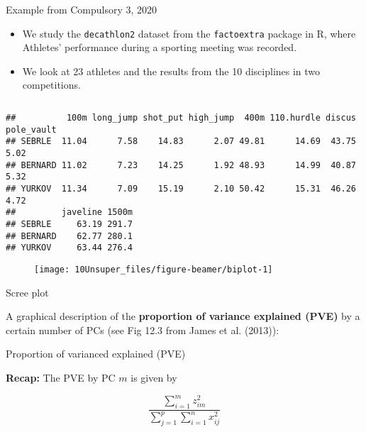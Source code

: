 \documentclass[
  10pt,
  ignorenonframetext,
]{beamer}
\begin{document}
\begin{frame}[fragile]
\begin{block}{Example from Compulsory 3, 2020}
\protect\hypertarget{example-from-compulsory-3-2020}{}
\(~\)

\begin{itemize}
\item
  We study the \texttt{decathlon2} dataset from the \texttt{factoextra}
  package in R, where Athletes' performance during a sporting meeting
  was recorded.
\item
  We look at 23 athletes and the results from the 10 disciplines in two
  competitions.
\end{itemize}

\(~\)

\scriptsize

\begin{verbatim}
##          100m long_jump shot_put high_jump  400m 110.hurdle discus pole_vault
## SEBRLE  11.04      7.58    14.83      2.07 49.81      14.69  43.75       5.02
## BERNARD 11.02      7.23    14.25      1.92 48.93      14.99  40.87       5.32
## YURKOV  11.34      7.09    15.19      2.10 50.42      15.31  46.26       4.72
##         javeline 1500m
## SEBRLE     63.19 291.7
## BERNARD    62.77 280.1
## YURKOV     63.44 276.4
\end{verbatim}
\end{block}
\end{frame}

\begin{frame}
\begin{figure}
\texttt{[image: 10Unsuper\_files/figure-beamer/biplot-1]} \end{figure}
\end{frame}

\begin{frame}
\begin{block}{Scree plot}
\protect\hypertarget{scree-plot}{}
\(~\)

A graphical description of the \textbf{proportion of variance explained
(PVE)} by a certain number of PCs (see Fig 12.3 from James et al.
(2013)):

\centering
\end{block}
\end{frame}

\begin{frame}
\begin{block}{Proportion of varianced explained (PVE)}
\protect\hypertarget{proportion-of-varianced-explained-pve}{}
\(~\)

\textbf{Recap:} The PVE by PC \(m\) is given by

\[
\frac{\sum_{i=1}^m z_{im}^2} {\sum_{j=1}^p\sum_{i=1}^n x_{ij}^2}
\]
\end{block}
\end{frame}
\end{document}
